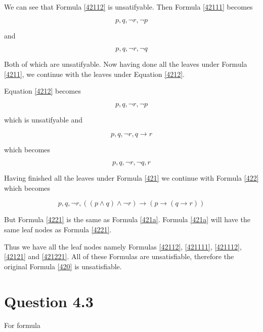 \documentclass[10pt,a4paper]{article}
\begin{document}
We can see that Formula \ref{42112} is unsatifyable.  Then Formula \ref{42111} becomes

\begin{equation}
\label{421111}
p, q, \neg r, \neg p 
\end{equation}

and 

\begin{equation}
\label{421112}
p, q, \neg r, \neg q 
\end{equation}

Both of which are unsatifyable. Now having done all the leaves under Formula \ref{4211}, we continue with the leaves under Equation \ref{4212}.

Equation \ref{4212} becomes

\begin{equation}
\label{42121}
p, q, \neg r, \neg p 
\end{equation}

which is unsatifyable and
 
\begin{equation}
\label{42122}
p, q, \neg r, q \rightarrow r 
\end{equation} 

which becomes

\begin{equation}
\label{421221}
p, q, \neg r, \neg q,  r 
\end{equation} 
 
Having finished all the leaves under Formula \ref{421} we continue with Formula \ref{422} which becomes

\begin{equation}
\label{4221}
 p, q, \neg r,  (( p \wedge q) \wedge \neg r) \rightarrow (p \rightarrow ( q \rightarrow r )) 
\end{equation} 

But Formula \ref{4221} is the same as Formula \ref{421a}. Formula \ref{421a} will have the same leaf nodes as Formula \ref{4221}.

Thus we have all the leaf nodes namely Formulas \ref{42112}, \ref{421111}, \ref{421112}, \ref{42121} and \ref{421221}. All of these Formulas are unsatisfiable, 
therefore the original Formula \ref{420} is unsatisfiable.

\section{Question 4.3}

For formula 
\end{document}
